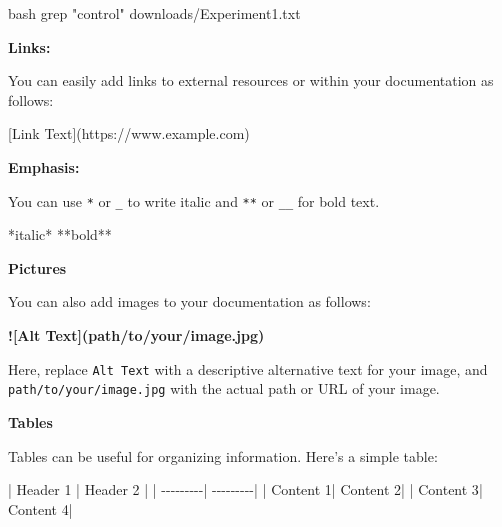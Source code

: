 \documentclass[
  letterpaper,
  DIV=11,
  numbers=noendperiod]{scrreprt}
\newenvironment{Shaded}{}{}
\newcommand{\AlertTok}[1]{\textcolor[rgb]{1.00,0.33,0.33}{\textbf{#1}}}
\newcommand{\CommentTok}[1]{\textcolor[rgb]{0.42,0.45,0.49}{#1}}
\newcommand{\FunctionTok}[1]{\textcolor[rgb]{0.44,0.26,0.76}{#1}}
\newcommand{\InformationTok}[1]{\textcolor[rgb]{0.42,0.45,0.49}{#1}}
\newcommand{\NormalTok}[1]{\textcolor[rgb]{0.14,0.16,0.18}{#1}}
\newcommand{\OtherTok}[1]{\textcolor[rgb]{0.44,0.26,0.76}{#1}}
\newcommand{\PreprocessorTok}[1]{\textcolor[rgb]{0.84,0.23,0.29}{#1}}
\newcommand{\StringTok}[1]{\textcolor[rgb]{0.01,0.18,0.38}{#1}}
\begin{document}
\begin{Shaded}
\begin{Highlighting}[]
\InformationTok{\textasciigrave{}\textasciigrave{}\textasciigrave{}bash}
\FunctionTok{grep} \StringTok{"control"}\NormalTok{ downloads/Experiment1.txt}
\InformationTok{\textasciigrave{}\textasciigrave{}\textasciigrave{}}
\end{Highlighting}
\end{Shaded}

\textbf{Links:}

You can easily add links to external resources or within your
documentation as follows:

\begin{Shaded}
\begin{Highlighting}[]
\CommentTok{[}\OtherTok{Link Text}\CommentTok{](https://www.example.com)}
\end{Highlighting}
\end{Shaded}

\textbf{Emphasis:}

You can use \texttt{*} or \texttt{\_} to write italic and \texttt{**} or
\texttt{\_\_} for bold text.

\begin{Shaded}
\begin{Highlighting}[]
\NormalTok{*italic*}
\NormalTok{**bold**}
\end{Highlighting}
\end{Shaded}

\textbf{Pictures}

You can also add images to your documentation as follows:

\begin{Shaded}
\begin{Highlighting}[]
\AlertTok{![Alt Text](path/to/your/image.jpg)}
\end{Highlighting}
\end{Shaded}

Here, replace \texttt{Alt\ Text} with a descriptive alternative text for
your image, and \texttt{path/to/your/image.jpg} with the actual path or
URL of your image.

\textbf{Tables}

Tables can be useful for organizing information. Here's a simple table:

\begin{Shaded}
\begin{Highlighting}[]
\PreprocessorTok{|}\NormalTok{ Header 1 }\PreprocessorTok{|}\NormalTok{ Header 2 }\PreprocessorTok{|}
\PreprocessorTok{| {-}{-}{-}{-}{-}{-}{-}{-}{-}| {-}{-}{-}{-}{-}{-}{-}{-}{-}|}
\PreprocessorTok{|}\NormalTok{ Content 1}\PreprocessorTok{|}\NormalTok{ Content 2}\PreprocessorTok{|}
\PreprocessorTok{|}\NormalTok{ Content 3}\PreprocessorTok{|}\NormalTok{ Content 4}\PreprocessorTok{|}
\end{Highlighting}
\end{Shaded}
\end{document}
